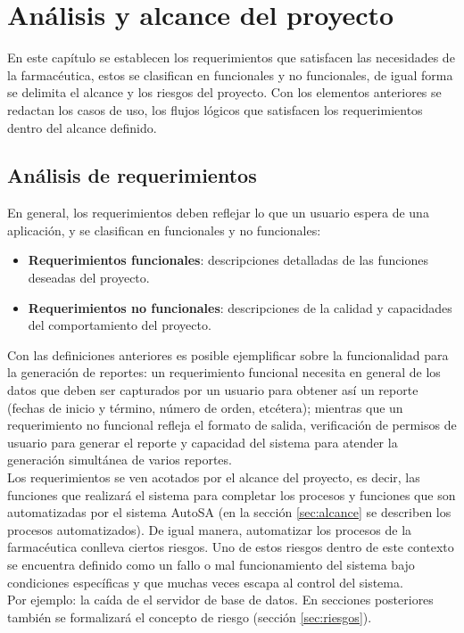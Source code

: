 \chapter{Análisis y alcance del proyecto}\label{cap2}

En este capítulo se establecen los requerimientos que satisfacen las necesidades de la farmacéutica, estos se clasifican en funcionales y no funcionales, de igual forma se delimita el alcance y los riesgos del proyecto. Con los elementos anteriores se redactan los casos de uso, los flujos lógicos que satisfacen los requerimientos dentro del alcance definido.


\section{Análisis de requerimientos}\label{sec:req-ana}
En general, los requerimientos deben reflejar lo que un usuario espera de una aplicación, y se clasifican en funcionales y no funcionales:
\begin{itemize}
\item \textbf{Requerimientos funcionales}: descripciones detalladas de las funciones deseadas del proyecto\cite{WileyBegSE}.
\item \textbf{Requerimientos no funcionales}: descripciones de la calidad y capacidades del comportamiento del proyecto\cite{WileyBegSE}.
\end{itemize}
Con las definiciones anteriores es posible ejemplificar sobre la funcionalidad para la generación de reportes: un requerimiento funcional necesita en general de los datos que deben ser capturados por un usuario para obtener así un reporte (fechas de inicio y término, número de orden, etcétera); mientras que un requerimiento no funcional refleja el formato de salida, verificación de permisos de usuario para generar el reporte y capacidad del sistema para atender la generación simultánea de varios reportes.\\
Los requerimientos se ven acotados por el alcance del proyecto, es decir, las funciones que realizará el sistema para completar los procesos y funciones que son automatizadas por el sistema AutoSA\cite{WileyBegSE} (en la sección \ref{sec:alcance} se describen los procesos automatizados). De igual manera, automatizar los procesos de la farmacéutica conlleva ciertos riesgos. Uno de estos riesgos dentro de este contexto se encuentra definido como un fallo o mal funcionamiento del sistema bajo condiciones específicas y que muchas veces escapa al control del sistema.\\
Por ejemplo: la caída de el servidor de base de datos. En secciones posteriores también se formalizará el concepto de riesgo (sección \ref{sec:riesgos}).


